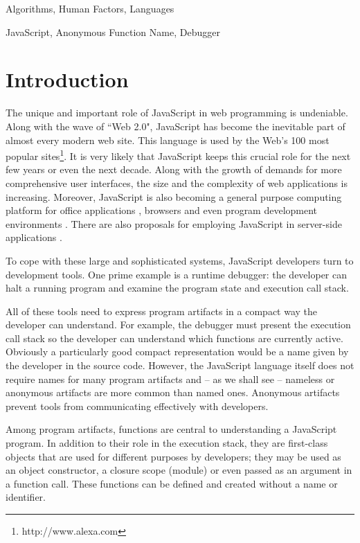 \documentclass[10pt, preprint]{sigplanconf}
\begin{document}
\terms
Algorithms, Human Factors, Languages

\keywords
JavaScript, Anonymous Function Name, Debugger

\section{Introduction}
The unique and important role of JavaScript in web programming is undeniable. Along with the wave of ``Web 2.0", JavaScript has become the inevitable part of almost every modern web site. This language is used by the Web's 100 most popular sites\footnote[1]{http://www.alexa.com}\cite{Richards1}. It is very likely that JavaScript keeps this crucial role for the next few years or even the next decade. Along with the growth of demands for more comprehensive user interfaces, the size and the complexity of web applications is increasing. Moreover, JavaScript is also becoming a general purpose computing platform\cite{Richards2} for office applications \cite{JSOffice, JSOffice2}, browsers \cite{FAO, GCE} and even program development environments \cite{Ingalls}. There are also proposals for employing JavaScript in server-side applications \cite{SSJSR, CJS}.

To cope with these large and sophisticated systems, JavaScript developers turn to development tools. One prime example is a runtime debugger: the developer can halt a running program and examine the program state and execution call stack. 

All of these tools need to express program artifacts in a compact way the developer can understand.  For example, the debugger must present the execution call stack so the developer can understand which functions are currently active.  Obviously a particularly good compact representation would be a name given by the developer in the source code. However, the JavaScript language itself does not require names for many program artifacts and -- as we shall see -- nameless or anonymous artifacts are more common than named ones. Anonymous artifacts prevent tools from communicating effectively with developers.

Among program artifacts, functions are central to understanding a JavaScript program. In addition to their role in the execution stack, they are first-class objects that are used for different purposes by developers; they may be used as an object constructor, a closure scope (module) or even  passed as an argument in a function call.  These functions can be defined and created without a name or identifier.  
\end{document}
